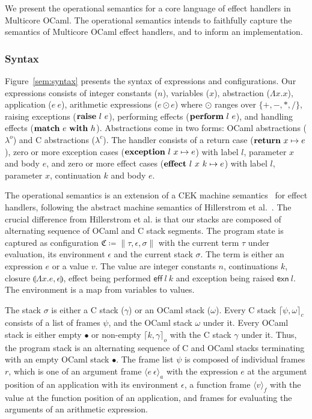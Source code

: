 \documentclass[sigplan,10pt,review,anonymous]{acmart}\settopmatter{printfolios=true,printccs=false,printacmref=false}
\newcommand{\lam}[2]{\Lambda #1. #2}
\newcommand{\env}{\epsilon}
\newcommand{\clos}[3]{\llparenthesis \lam{#1}{#2}, #3 \rrparenthesis}
\newcommand{\kw}[1]{\text{\bf #1}}
\newcommand{\effval}[2]{\textsf{eff} ~#1 ~#2}
\newcommand{\exnval}[1]{\textsf{exn} ~#1}
\newcommand{\handle}[2]{\kw{match} ~#1 ~\kw{with} ~#2}
\newcommand{\throw}[2]{\kw{raise} ~#1 ~#2}
\newcommand{\perform}[2]{\kw{perform} ~#1 ~#2}
\newcommand{\caseval}[2]{\kw{return}~#1 \mapsto #2}
\newcommand{\caseexn}[3]{\kw{exception} ~#1 ~#2 \mapsto #3}
\newcommand{\caseeff}[4]{\kw{effect} ~#1 ~#2 ~#3 \mapsto #4}
\newcommand{\farg}[2]{\langle #1 ~#2 \rangle_a}
\newcommand{\ffun}[1]{\langle #1 \rangle_f}
\newcommand{\fl}{\psi} %
\newcommand{\cstack}{\gamma} %
\newcommand{\ostack}{\omega} %
\newcommand{\cstacka}[2]{\big \lceil #1, #2 \big \rceil_c} %
\newcommand{\ostacka}[2]{\big \lceil #1, #2 \big \rceil_o} %
\newcommand{\ostackemp}{\bullet}
\newcommand{\stack}{\sigma}
\newcommand{\config}{\mathfrak{C}}
\newcommand{\configa}[3]{\|#1,#2,#3\|}
\begin{document}
We present the operational semantics for a core language of effect handlers in
Multicore OCaml. The operational semantics intends to faithfully capture the
semantics of Multicore OCaml effect handlers, and to inform an implementation.

\subsubsection{Syntax}

Figure~\ref{sem:syntax} presents the syntax of expressions and configurations.
Our expressions consists of integer constants ($n$), variables ($x$),
abstraction ($\lam{x}{x}$), application ($e~e$), arithmetic expressions ($e
\odot e$) where $\odot$ ranges over $\{+,-,*,/\}$, raising exceptions
($\throw{l}{e}$), performing effects ($\perform{l}{e}$), and handling effects
($\handle{e}{h}$). Abstractions come in two forms: OCaml abstractions
($\lambda^o$) and C abstractions ($\lambda^c$). The handler consists of a
return case ($\caseval{x}{e}$), zero or more exception cases
($\caseexn{l}{x}{e}$) with label $l$, parameter $x$ and body $e$, and zero or
more effect cases ($\caseeff{l}{x}{k}{e}$) with label $l$, parameter $x$,
continuation $k$ and body $e$.

The operational semantics is an extension of a CEK machine
semantics~\cite{Felleisen} for effect handlers, following the abstract machine
semantics of Hillerstrom et al.~\cite{Hillerstrom2020}. The crucial difference
from Hillerstrom et al. is that our stacks are composed of alternating sequence
of OCaml and C stack segments. The program state is captured as configuration
$\config \coloneqq \configa{\tau}{\env}{\stack}$ with the current term $\tau$
under evaluation, its environment $\env$ and the current stack $\stack$. The
term is either an expression $e$ or a value $v$. The value are integer
constants $n$, continuations $k$, closure $\clos{x}{e}{\env}$, effect being
performed $\effval{l}{k}$ and exception being raised $\exnval{l}$. The
environment is a map from variables to values.

The stack $\stack$ is either a C stack ($\cstack$) or an OCaml stack
($\ostack$). Every C stack $\cstacka{\fl}{\ostack}$ consists of a list of
frames $\fl$, and the OCaml stack $\ostack$ under it. Every OCaml stack is
either empty $\ostackemp$ or non-empty $\ostacka{k}{\cstack}$ with the
C stack $\cstack$ under it. Thus, the program stack is an alternating sequence
of C and OCaml stacks terminating with an empty OCaml stack $\ostackemp$. The
frame list $\fl$ is composed of individual frames $r$, which is one of an
argument frame $\farg{e}{\env}$ with the expression $e$ at the argument
position of an application with its environment $\env$, a function frame
$\ffun{v}$ with the value at the function position of an application, and
frames for evaluating the arguments of an arithmetic expression.
\end{document}
